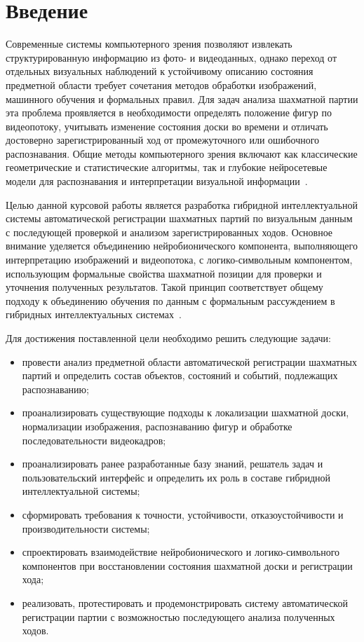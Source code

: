 \section*{Введение}

Современные системы компьютерного зрения позволяют извлекать структурированную информацию из фото- и видеоданных, однако переход от отдельных визуальных наблюдений к устойчивому описанию состояния предметной области требует сочетания методов обработки изображений, машинного обучения и формальных правил. Для задач анализа шахматной партии эта проблема проявляется в необходимости определять положение фигур по видеопотоку, учитывать изменение состояния доски во времени и отличать достоверно зарегистрированный ход от промежуточного или ошибочного распознавания. Общие методы компьютерного зрения включают как классические геометрические и статистические алгоритмы, так и глубокие нейросетевые модели для распознавания и интерпретации визуальной информации~\cite{Szeliski2022,Goodfellow2016,Wolflein2021}.

Целью данной курсовой работы является разработка гибридной интеллектуальной системы автоматической регистрации шахматных партий по визуальным данным с последующей проверкой и анализом зарегистрированных ходов. Основное внимание уделяется объединению нейробионического компонента, выполняющего интерпретацию изображений и видеопотока, с логико-символьным компонентом, использующим формальные свойства шахматной позиции для проверки и уточнения полученных результатов. Такой принцип соответствует общему подходу к объединению обучения по данным с формальным рассуждением в гибридных интеллектуальных системах~\cite{Garcez2008}.

Для достижения поставленной цели необходимо решить следующие задачи:
\begin{itemize}
    \item провести анализ предметной области автоматической регистрации шахматных партий и определить состав объектов, состояний и событий, подлежащих распознаванию;
    \item проанализировать существующие подходы к локализации шахматной доски, нормализации изображения, распознаванию фигур и обработке последовательности видеокадров;
    \item проанализировать ранее разработанные базу знаний, решатель задач и пользовательский интерфейс и определить их роль в составе гибридной интеллектуальной системы;
    \item сформировать требования к точности, устойчивости, отказоустойчивости и производительности системы;
    \item спроектировать взаимодействие нейробионического и логико-символьного компонентов при восстановлении состояния шахматной доски и регистрации хода;
    \item реализовать, протестировать и продемонстрировать систему автоматической регистрации партии с возможностью последующего анализа полученных ходов.
\end{itemize}

